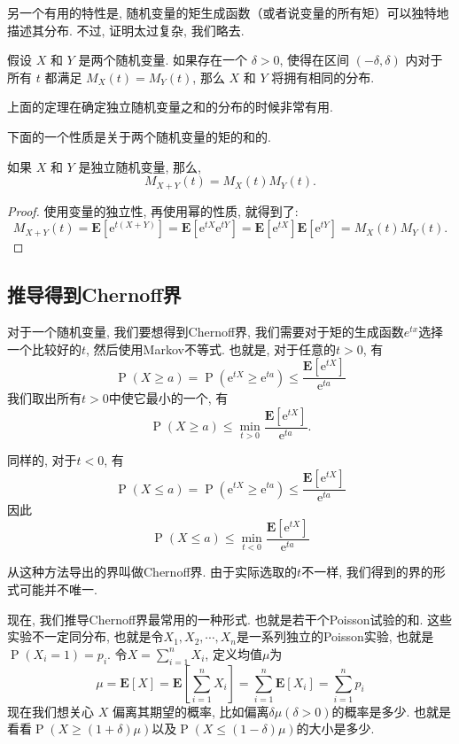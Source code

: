 另一个有用的特性是, 随机变量的矩生成函数（或者说变量的所有矩）可以独特地描述其分布. 
不过, 证明太过复杂, 我们略去. 

\begin{theorem}
假设 $X$ 和 $Y$ 是两个随机变量. 如果存在一个 $\delta > 0$, 使得在区间 $(-\delta, \delta)$ 内对于所有 $t$ 都满足
$M_X(t) = M_Y(t)$, 那么 $X$ 和 $Y$ 将拥有相同的分布. 

\end{theorem}

上面的定理在确定独立随机变量之和的分布的时候非常有用. 

下面的一个性质是关于两个随机变量的矩的和的. 
\begin{theorem}
    如果 $X$ 和 $Y$ 是独立随机变量, 那么, $$M_{X+Y}(t)=M_X(t) M_Y(t).$$
\end{theorem}

\begin{proof}
    使用变量的独立性, 再使用幂的性质, 就得到了:$$M_{X+Y}(t)=\mathbf{E}\left[\mathrm{e}^{t(X+Y)}\right]=\mathbf{E}\left[\mathrm{e}^{t X} \mathrm{e}^{t Y}\right]=\mathbf{E}\left[\mathrm{e}^{t X}\right] \mathbf{E}\left[\mathrm{e}^{t Y}\right]=M_X(t) M_Y(t).$$
\end{proof}

\subsection{推导得到Chernoff界}

对于一个随机变量, 我们要想得到Chernoff界, 我们需要对于矩的生成函数$e^{tx}$选择一个比较好的$t$, 然后使用Markov不等式. 也就是, 对于任意的$t>0$, 有$$\operatorname{P}(X \geq a)=\operatorname{P}\left(\mathrm{e}^{t X} \geq \mathrm{e}^{t a}\right) \leq \frac{\mathbf{E}\left[\mathrm{e}^{t X}\right]}{\mathrm{e}^{t a}}$$我们取出所有$t>0$中使它最小的一个, 有$$
\operatorname{P}(X \geq a) \leq \min _{t>0} \frac{\mathbf{E}\left[\mathrm{e}^{t X}\right]}{\mathrm{e}^{t a}}.$$

同样的, 对于$t<0$, 有
$$
\operatorname{P}(X \leq a)=\operatorname{P}\left(\mathrm{e}^{t X} \geq \mathrm{e}^{t a}\right) \leq \frac{\mathbf{E}\left[\mathrm{e}^{t X}\right]}{\mathrm{e}^{t a}}
$$
因此
$$
\operatorname{P}(X \leq a) \leq \min _{t<0} \frac{\mathbf{E}\left[\mathrm{e}^{t X}\right]}{\mathrm{e}^{t a}}
$$

从这种方法导出的界叫做Chernoff界. 由于实际选取的$t$不一样, 我们得到的界的形式可能并不唯一. 

现在, 我们推导Chernoff界最常用的一种形式. 也就是若干个Poisson试验的和. 这些实验不一定同分布,  也就是令$X_1, X_2, \cdots, X_n$是一系列独立的Poisson实验, 也就是$\operatorname{P}\left(X_i=1\right)=p_i$. 令$X=\sum_{i=1}^n X_i$, 定义均值$\mu$为
$$
\mu=\mathbf{E}[X]=\mathbf{E}\left[\sum_{i=1}^n X_i\right]=\sum_{i=1}^n \mathbf{E}\left[X_i\right]=\sum_{i=1}^n p_i
$$
现在我们想关心 $X$ 偏离其期望的概率, 比如偏离$\delta \mu(\delta>0)$的概率是多少.  也就是看看$\operatorname{P}(X \geq(1+\delta) \mu)$以及$\operatorname{P}(X \leq(1-\delta) \mu)$的大小是多少.

